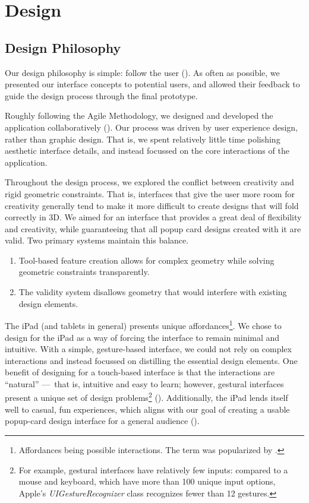 \chapter{Design}

\section{Design Philosophy}\label{design-philosophy}

Our design philosophy is simple: follow the user
(\citet{bell2008design}). As often as possible, we presented our
interface concepts to potential users, and allowed their feedback to
guide the design process through the final prototype.

Roughly following the Agile Methodology, we designed and developed the
application collaboratively (\citet{martin2003agile}). Our process was
driven by user experience design, rather than graphic design. That is,
we spent relatively little time polishing aesthetic interface details,
and instead focussed on the core interactions of the application.

Throughout the design process, we explored the conflict between
creativity and rigid geometric constraints. That is, interfaces that
give the user more room for creativity generally tend to make it more
difficult to create designs that will fold correctly in 3D. We aimed for
an interface that provides a great deal of flexibility and creativity,
while guaranteeing that all popup card designs created with it are
valid. Two primary systems maintain this balance.

\begin{enumerate}
\def\labelenumi{\arabic{enumi})}
\itemsep1pt\parskip0pt
\item
  Tool-based feature creation allows for complex geometry while solving
  geometric constraints transparently.
\item
  The validity system disallows geometry that would interfere with
  existing design elements.
\end{enumerate}

The iPad (and tablets in general) presents unique affordances\footnote{Affordances
  being possible interactions. The term was popularized by
  \citet{norman2013design}.}. We chose to design for the iPad as a way
of forcing the interface to remain minimal and intuitive. With a simple,
gesture-based interface, we could not rely on complex interactions and
instead focussed on distilling the essential design elements. One
benefit of designing for a touch-based interface is that the
interactions are ``natural'' ---~that is, intuitive and easy to learn;
however, gestural interfaces present a unique set of design
problems\footnote{For example, gestural interfaces have relatively few
  inputs: compared to a mouse and keyboard, which have more than 100
  unique input options, Apple's \emph{UIGestureRecognizer} class
  recognizes fewer than 12 gestures.} (\citet{norman2010gestural}).
Additionally, the iPad lends itself well to casual, fun experiences,
which aligns with our goal of creating a usable popup-card design
interface for a general audience (\citet{johansen2013ipad}).

